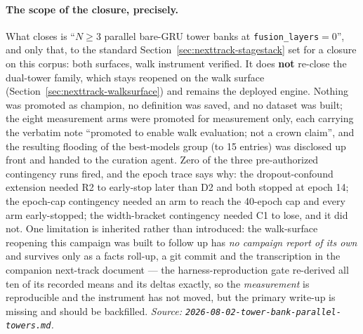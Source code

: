 \documentclass[11pt]{article}
\begin{document}
\paragraph{The scope of the closure, precisely.} What closes is
``$N\ge3$ parallel bare-GRU tower banks at \texttt{fusion\_layers}${}=0$'', and
only that, to the standard Section~\ref{sec:nexttrack-stagestack} set for a
closure on this corpus: both surfaces, walk instrument verified. It does
\textbf{not} re-close the dual-tower family, which stays reopened on the walk
surface (Section~\ref{sec:nexttrack-walksurface}) and remains the deployed engine. Nothing
was promoted as champion, no definition was saved, and no dataset was built; the
eight measurement arms were promoted for measurement only, each carrying the
verbatim note ``promoted to enable walk evaluation; not a crown claim'', and the
resulting flooding of the best-models group (to \num{15} entries) was disclosed up
front and handed to the curation agent. Zero of the three pre-authorized
contingency runs fired, and the epoch trace says why: the dropout-confound
extension needed R2 to early-stop later than D2 and both stopped at epoch
\num{14}; the epoch-cap contingency needed an arm to reach the \num{40}-epoch cap
and every arm early-stopped; the width-bracket contingency needed C1 to lose, and
it did not. One limitation is inherited rather than introduced: the walk-surface
reopening this campaign was built to follow up has \emph{no campaign report of its
own} and survives only as a facts roll-up, a git commit and the transcription in
the companion next-track document --- the harness-reproduction gate re-derived all
ten of its recorded means and its deltas exactly, so the \emph{measurement} is
reproducible and the instrument has not moved, but the primary write-up is
missing and should be backfilled.
\emph{Source: \texttt{2026-08-02-tower-bank-parallel-towers.md}.}
\end{document}
